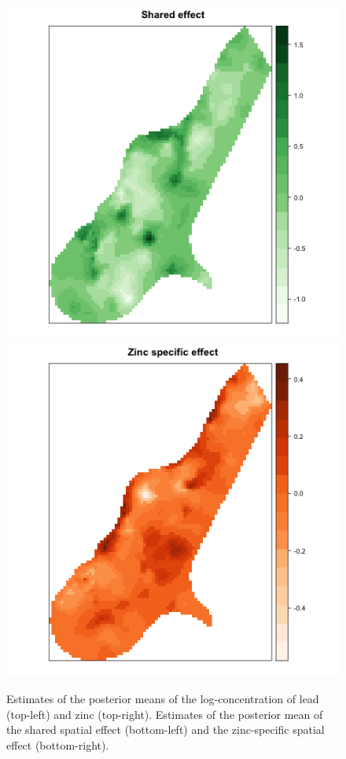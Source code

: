 \begin{figure}[h!]
\begin{center}
\includegraphics[scale=0.35]{images/Meuse_Shared_effect.png}
\includegraphics[scale=0.35]{images/Meuse_Zinc_specific.png}
\end{center}
\caption{Estimates of the posterior means of the log-concentration of lead (top-left) and zinc (top-right). Estimates of the posterior mean of the shared spatial effect (bottom-left) and the zinc-specific spatial effect (bottom-right).}
\label{fig:meuse:est}
\end{figure}





